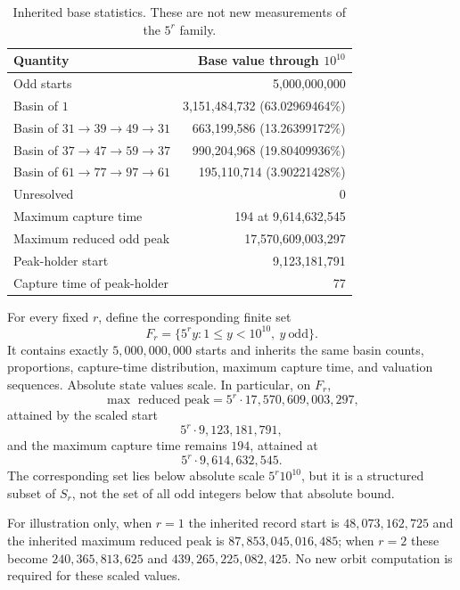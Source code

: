 \documentclass[11pt]{article}
\begin{document}
\begin{table}[ht]
\centering
\small
\begin{tabular}{@{}lr@{}}
\toprule
Quantity & Base value through $10^{10}$\\
\midrule
Odd starts & 5,000,000,000\\
Basin of $1$ & 3,151,484,732 (63.02969464\%)\\
Basin of $31\to39\to49\to31$ & 663,199,586 (13.26399172\%)\\
Basin of $37\to47\to59\to37$ & 990,204,968 (19.80409936\%)\\
Basin of $61\to77\to97\to61$ & 195,110,714 (3.90221428\%)\\
Unresolved & 0\\
Maximum capture time & 194 at 9,614,632,545\\
Maximum reduced odd peak & 17,570,609,003,297\\
Peak-holder start & 9,123,181,791\\
Capture time of peak-holder & 77\\
\bottomrule
\end{tabular}
\caption{Inherited base statistics. These are not new measurements of the $5^r$ family.}
\label{tab:base}
\end{table}

For every fixed $r$, define the corresponding finite set
\begin{equation}
F_r=\{5^ry:1\le y<10^{10},\ y\ \text{odd}\}.
\label{eq:Fr}
\end{equation}
It contains exactly $5,000,000,000$ starts and inherits the same basin counts, proportions, capture-time distribution, maximum capture time, and valuation sequences. Absolute state values scale. In particular, on $F_r$,
\begin{equation}
\max\text{ reduced peak}=5^r\cdot17,570,609,003,297,
\end{equation}
attained by the scaled start
\begin{equation}
5^r\cdot9,123,181,791,
\end{equation}
and the maximum capture time remains $194$, attained at
\begin{equation}
5^r\cdot9,614,632,545.
\end{equation}
The corresponding set lies below absolute scale $5^r10^{10}$, but it is a structured subset of $S_r$, not the set of all odd integers below that absolute bound.

For illustration only, when $r=1$ the inherited record start is $48,073,162,725$ and the inherited maximum reduced peak is $87,853,045,016,485$; when $r=2$ these become $240,365,813,625$ and $439,265,225,082,425$. No new orbit computation is required for these scaled values.
\end{document}
